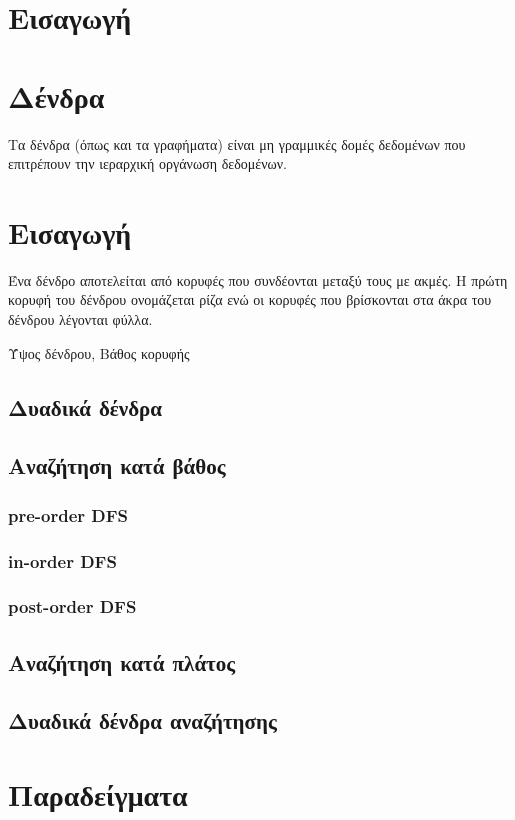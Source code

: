 \section{Εισαγωγή}

\section{Δένδρα}
Τα δένδρα (όπως και τα γραφήματα) είναι μη γραμμικές δομές δεδομένων που επιτρέπουν την ιεραρχική οργάνωση δεδομένων. 

\section{Εισαγωγή}
Ένα δένδρο αποτελείται από κορυφές που συνδέονται μεταξύ τους με ακμές. Η πρώτη κορυφή του δένδρου ονομάζεται ρίζα ενώ οι κορυφές που βρίσκονται στα άκρα του δένδρου λέγονται φύλλα.

Ύψος δένδρου, Βάθος κορυφής

\subsection{Δυαδικά δένδρα}

\subsection{Αναζήτηση κατά βάθος}
\subsubsection{pre-order DFS}
\subsubsection{in-order DFS}
\subsubsection{post-order DFS}

\subsection{Αναζήτηση κατά πλάτος}

\subsection{Δυαδικά δένδρα αναζήτησης}

\section{Παραδείγματα}

